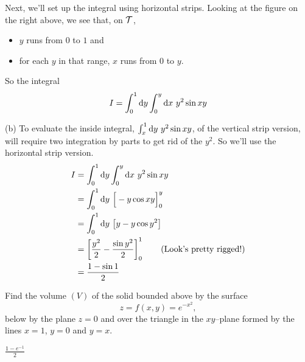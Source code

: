 \begin{solution}
Next, we'll set up the integral using horizontal strips. Looking
at the figure on the right above, we see that, on $\mathcal{T}$,
\begin{itemize}
\item
$y$ runs from $0$ to $1$ and
\item
for each $y$ in that range, $x$ runs from $0$ to $y$.
\end{itemize}
So the integral
\begin{align*}
I=\int_0^1\mathrm{d}y\int_0^y\mathrm{d}x\ y^2\sin xy
\end{align*}

(b) To evaluate the inside integral,  $\int_x^1\mathrm{d}y\ y^2\sin xy$,
of the vertical strip version, will require two integration by
parts to get rid of the $y^2$. So we'll use the horizontal strip version.
\begin{align*}
I&=\int_0^1\mathrm{d}y\int_0^y\mathrm{d}x\ y^2\sin xy \\
&=\int_0^1\mathrm{d}y\ \Big[-y\cos xy\Big]_0^y \\
&=\int_0^1\mathrm{d}y\ \big[y-y\cos y^2\big] \\
&=\left[\frac{y^2}{2}-\frac{\sin y^2}{2}\right]_0^1
\qquad\text{(Look's pretty rigged!)} \\
&= \frac{1-\sin 1}{2}
\end{align*}

\end{solution}

\begin{question}[M200 2009D] %
Find the volume $(V)$ of the solid bounded above by the surface
\begin{equation*}
z = f (x,y) = e^{-x^2},
\end{equation*}
below by the plane $z = 0$ and over the triangle in the $xy$--plane
formed by the lines $x = 1$, $y = 0$ and $y = x$.

\end{question}

%

\begin{answer}
$\frac{1-e^{-1}}{2}$
\end{answer}

